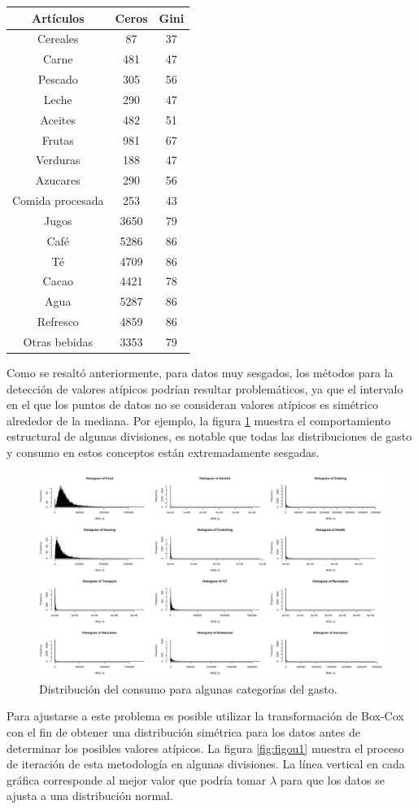 \documentclass[
  12pt,
]{book}
\begin{document}
\begin{longtable}[]{@{}ccc@{}}
\toprule()
Artículos & Ceros & Gini \\
\midrule()
\endhead
Cereales & 87 & 37 \\
Carne & 481 & 47 \\
Pescado & 305 & 56 \\
Leche & 290 & 47 \\
Aceites & 482 & 51 \\
Frutas & 981 & 67 \\
Verduras & 188 & 47 \\
Azucares & 290 & 56 \\
Comida procesada & 253 & 43 \\
Jugos & 3650 & 79 \\
Café & 5286 & 86 \\
Té & 4709 & 86 \\
Cacao & 4421 & 78 \\
Agua & 5287 & 86 \\
Refresco & 4859 & 86 \\
Otras bebidas & 3353 & 79 \\
\bottomrule()
\end{longtable}

Como se resaltó anteriormente, para datos muy sesgados, los métodos para la detección de valores atípicos podrían resultar problemáticos, ya que el intervalo en el que los puntos de datos no se consideran valores atípicos es simétrico alrededor de la mediana. Por ejemplo, la figura \ref{fig:figou2} muestra el comportamiento estructural de algunas divisiones, es notable que todas las distribuciones de gasto y consumo en estos conceptos están extremadamente sesgadas.

\begin{figure}
\includegraphics[width=0.5\linewidth]{Pics/ou2} \caption{Distribución del consumo para algunas categorías del gasto.}\label{fig:figou2}
\end{figure}

Para ajustarse a este problema es posible utilizar la transformación de Box-Cox con el fin de obtener una distribución simétrica para los datos antes de determinar los posibles valores atípicos. La figura \ref{fig:figou1} muestra el proceso de iteración de esta metodología en algunas divisiones. La línea vertical en cada gráfica corresponde al mejor valor que podría tomar \(\lambda\) para que los datos se ajusta a una distribución normal.
\end{document}
